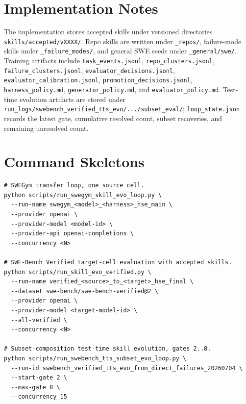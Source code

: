 \documentclass{article}
\begin{document}



\appendix
\section{Implementation Notes}

The implementation stores accepted skills under versioned directories
\texttt{skills/accepted/vXXXX/}. Repo skills are written under
\texttt{\_repos/}, failure-mode skills under \texttt{\_failure\_modes/}, and
general SWE seeds under \texttt{\_general/swe/}. Training artifacts include
\texttt{task\_events.jsonl}, \texttt{repo\_clusters.jsonl},
\texttt{failure\_clusters.jsonl}, \texttt{evaluator\_decisions.jsonl},
\texttt{evaluator\_calibration.jsonl}, \texttt{promotion\_decisions.jsonl},
\texttt{harness\_policy.md}, \texttt{generator\_policy.md}, and
\texttt{evaluator\_policy.md}. Test-time evolution artifacts are stored under
\texttt{run\_logs/swebench\_verified\_tts\_evo/.../subset\_eval/};
\texttt{loop\_state.json} records the latest gate, cumulative resolved count,
subset recoveries, and remaining unresolved count.

\section{Command Skeletons}

\begin{verbatim}
# SWEGym transfer loop, one source cell.
python scripts/run_swegym_skill_evo_loop.py \
  --run-name swegym_<model>_<harness>_hse_main \
  --provider openai \
  --provider-model <model-id> \
  --provider-api openai-completions \
  --concurrency <N>

# SWE-Bench Verified target-cell evaluation with accepted skills.
python scripts/run_skill_evo_verified.py \
  --run-name verified_<source>_to_<target>_hse_final \
  --dataset swe-bench/swe-bench-verified@2 \
  --provider openai \
  --provider-model <target-model-id> \
  --all-verified \
  --concurrency <N>

# Subset-composition test-time skill evolution, gates 2..8.
python scripts/run_swebench_tts_subset_evo_loop.py \
  --run-id swebench_verified_tts_evo_from_direct_failures_20260704 \
  --start-gate 2 \
  --max-gate 8 \
  --concurrency 15
\end{verbatim}
\end{document}
